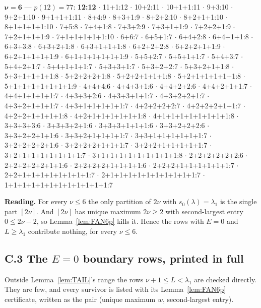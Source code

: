 {\noindent
$\boldsymbol{\nu = 6}$ --- $p(12) = 77$:\quad
\textbf{12:12} $\cdot$ 11+1:12 $\cdot$ 10+2:11 $\cdot$ 10+1+1:11 $\cdot$ 9+3:10 $\cdot$
9+2+1:10 $\cdot$ 9+1+1+1:11 $\cdot$ 8+4:9 $\cdot$ 8+3+1:9 $\cdot$ 8+2+2:10 $\cdot$
8+2+1+1:10 $\cdot$ 8+1+1+1+1:10 $\cdot$ 7+5:8 $\cdot$ 7+4+1:8 $\cdot$ 7+3+2:9 $\cdot$
7+3+1+1:9 $\cdot$ 7+2+2+1:9 $\cdot$ 7+2+1+1+1:9 $\cdot$ 7+1+1+1+1+1:10 $\cdot$ 6+6:7
$\cdot$ 6+5+1:7 $\cdot$ 6+4+2:8 $\cdot$ 6+4+1+1:8 $\cdot$ 6+3+3:8 $\cdot$ 6+3+2+1:8 $\cdot$
6+3+1+1+1:8 $\cdot$ 6+2+2+2:8 $\cdot$ 6+2+2+1+1:9 $\cdot$ 6+2+1+1+1+1:9 $\cdot$
6+1+1+1+1+1+1:9 $\cdot$ 5+5+2:7 $\cdot$ 5+5+1+1:7 $\cdot$ 5+4+3:7 $\cdot$ 5+4+2+1:7 $\cdot$
5+4+1+1+1:7 $\cdot$ 5+3+3+1:7 $\cdot$ 5+3+2+2:7 $\cdot$ 5+3+2+1+1:8 $\cdot$
5+3+1+1+1+1:8 $\cdot$ 5+2+2+2+1:8 $\cdot$ 5+2+2+1+1+1:8 $\cdot$ 5+2+1+1+1+1+1:8 $\cdot$
5+1+1+1+1+1+1+1:9 $\cdot$ 4+4+4:6 $\cdot$ 4+4+3+1:6 $\cdot$ 4+4+2+2:6 $\cdot$
4+4+2+1+1:7 $\cdot$ 4+4+1+1+1+1:7 $\cdot$ 4+3+3+2:6 $\cdot$ 4+3+3+1+1:7 $\cdot$
4+3+2+2+1:7 $\cdot$ 4+3+2+1+1+1:7 $\cdot$ 4+3+1+1+1+1+1:7 $\cdot$ 4+2+2+2+2:7 $\cdot$
4+2+2+2+1+1:7 $\cdot$ 4+2+2+1+1+1+1:8 $\cdot$ 4+2+1+1+1+1+1+1:8 $\cdot$
4+1+1+1+1+1+1+1+1:8 $\cdot$ 3+3+3+3:6 $\cdot$ 3+3+3+2+1:6 $\cdot$ 3+3+3+1+1+1:6 $\cdot$
3+3+2+2+2:6 $\cdot$ 3+3+2+2+1+1:6 $\cdot$ 3+3+2+1+1+1+1:7 $\cdot$ 3+3+1+1+1+1+1+1:7
$\cdot$ 3+2+2+2+2+1:6 $\cdot$ 3+2+2+2+1+1+1:7 $\cdot$ 3+2+2+1+1+1+1+1:7 $\cdot$
3+2+1+1+1+1+1+1+1:7 $\cdot$ 3+1+1+1+1+1+1+1+1+1:8 $\cdot$ 2+2+2+2+2+2:6 $\cdot$
2+2+2+2+2+1+1:6 $\cdot$ 2+2+2+2+1+1+1+1:6 $\cdot$ 2+2+2+1+1+1+1+1+1:7 $\cdot$
2+2+1+1+1+1+1+1+1+1:7 $\cdot$ 2+1+1+1+1+1+1+1+1+1+1:7 $\cdot$
1+1+1+1+1+1+1+1+1+1+1+1:7
\par}

\medskip
\noindent
\textbf{Reading.} For every $\nu \le 6$ the only partition of $2\nu$ with
$s_0(\lambda) = \lambda_1$ is the single part $[2\nu]$. And $[2\nu]$ has unique maximum
$2\nu \ge 2$ with second-largest entry $0 \le 2\nu-2$, so Lemma~\ref{lem:FAN6p} kills it.
Hence the rows with $E = 0$ and $L \ge \lambda_1$ contribute nothing, for every $\nu \le 6$.

\subsection*{C.3 The \texorpdfstring{$E = 0$}{E = 0} boundary rows, printed in full}

Outside Lemma~\ref{lem:TAIL}'s range the rows $\nu+1 \le L < \lambda_1$ are checked
directly. They are few, and every survivor is listed with its Lemma~\ref{lem:FAN6p}
certificate, written as the pair (unique maximum $w$, second-largest entry).

